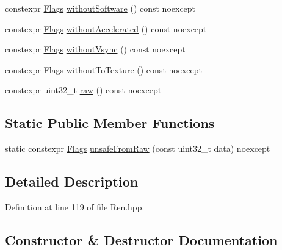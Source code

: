 \begin{DoxyCompactItemize}
\item 
constexpr \mbox{\hyperlink{structrolmodl_1_1blend_mode_1_1ren_1_1_flags}{Flags}} \mbox{\hyperlink{structrolmodl_1_1blend_mode_1_1ren_1_1_flags_afb5469bfe8cf85e54e698c064be9f4f1}{without\+Software}} () const noexcept
\item 
constexpr \mbox{\hyperlink{structrolmodl_1_1blend_mode_1_1ren_1_1_flags}{Flags}} \mbox{\hyperlink{structrolmodl_1_1blend_mode_1_1ren_1_1_flags_a3af63934530519fccf5202d675e1be32}{without\+Accelerated}} () const noexcept
\item 
constexpr \mbox{\hyperlink{structrolmodl_1_1blend_mode_1_1ren_1_1_flags}{Flags}} \mbox{\hyperlink{structrolmodl_1_1blend_mode_1_1ren_1_1_flags_a5b86e3989727c71182e51af747071af1}{without\+Vsync}} () const noexcept
\item 
constexpr \mbox{\hyperlink{structrolmodl_1_1blend_mode_1_1ren_1_1_flags}{Flags}} \mbox{\hyperlink{structrolmodl_1_1blend_mode_1_1ren_1_1_flags_a44d730a9e6de9abe7186a838055c5bc1}{without\+To\+Texture}} () const noexcept
\item 
constexpr uint32\+\_\+t \mbox{\hyperlink{structrolmodl_1_1blend_mode_1_1ren_1_1_flags_a718c7b92534eb4ad0febccff27275693}{raw}} () const noexcept
\end{DoxyCompactItemize}
\subsection*{Static Public Member Functions}
\begin{DoxyCompactItemize}
\item 
static constexpr \mbox{\hyperlink{structrolmodl_1_1blend_mode_1_1ren_1_1_flags}{Flags}} \mbox{\hyperlink{structrolmodl_1_1blend_mode_1_1ren_1_1_flags_affd5f9207e462f27e0fd1062424b9fe3}{unsafe\+From\+Raw}} (const uint32\+\_\+t data) noexcept
\end{DoxyCompactItemize}


\subsection{Detailed Description}


Definition at line 119 of file Ren.\+hpp.



\subsection{Constructor \& Destructor Documentation}
\mbox{\label{structrolmodl_1_1blend_mode_1_1ren_1_1_flags_a442202586935b743657456ad19d7f5ab}} 
